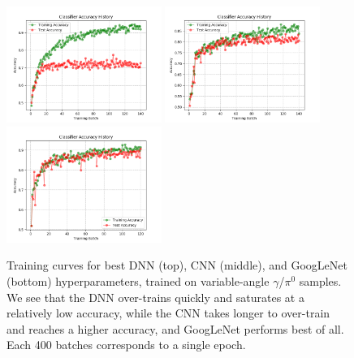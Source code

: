 \begin{figure}[htbp]
\centering
\includegraphics[width=0.45\textwidth]{Images/Calo/DNN_accuracy_batches_long.png}
\includegraphics[width=0.45\textwidth]{Images/Calo/CNN_accuracy_batches_long.png}
\includegraphics[width=0.45\textwidth]{Images/Calo/GN_accuracy_batches_long.png}
\caption{Training curves for best DNN (top), CNN (middle), and GoogLeNet (bottom) hyperparameters, trained on variable-angle $\gamma$/$\pi^0$ samples. We see that the DNN over-trains quickly and saturates at a relatively low accuracy, while the CNN takes longer to over-train and reaches a higher accuracy, and GoogLeNet performs best of all. Each 400 batches corresponds to a single epoch.}
\label{fig:training_curves_comparison_gamma_pi0}
\end{figure}